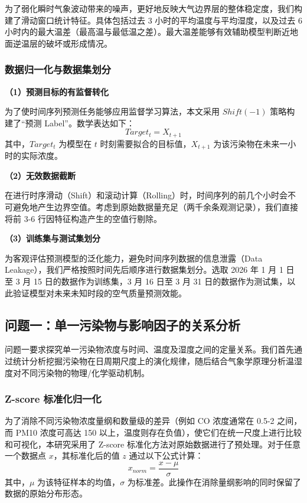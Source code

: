 \documentclass[a4paper, 12pt]{ctexart} %
\begin{document}
为了弱化瞬时气象波动带来的噪声，更好地反映大气边界层的整体稳定度，我们构建了滑动窗口统计特征。具体包括过去 3 小时的平均温度与平均湿度，以及过去 6 小时内的最大温差（最高温与最低温之差）。最大温差能够有效辅助模型判断近地面逆温层的破坏或形成情况。

\subsubsection{数据归一化与数据集划分}

\textbf{（1）预测目标的有监督转化}

为了使时间序列预测任务能够应用监督学习算法，本文采用 $Shift(-1)$ 策略构建了“预测 Label”。数学表达如下：
$$ Target_{t} = X_{t+1} $$
其中，$Target_{t}$ 为模型在 $t$ 时刻需要拟合的目标值，$X_{t+1}$ 为该污染物在未来一小时的实际浓度。

\textbf{（2）无效数据截断}

在进行时序滑动（Shift）和滚动计算（Rolling）时，时间序列的前几个小时会不可避免地产生边界空值。考虑到原始数据量充足（两千余条观测记录），我们直接将前 3-6 行因特征构造产生的空值行剔除。


\textbf{（3）训练集与测试集划分}

为客观评估预测模型的泛化能力，避免时间序列数据的信息泄露（Data Leakage），我们严格按照时间先后顺序进行数据集划分。选取 2026 年 1 月 1 日至 3 月 15 日的数据作为训练集，3 月 16 日至 3 月 31 日的数据作为测试集，以此验证模型对未来未知时段的空气质量预测效能。


\subsection{问题一：单一污染物与影响因子的关系分析}

问题一要求探究单一污染物浓度与时间、温度及湿度之间的定量关系。我们首先通过统计分析挖掘污染物在日周期尺度上的演化规律，随后结合气象学原理分析温湿度对不同污染物的物理/化学驱动机制。

\subsubsection{Z-score 标准化归一化}
为了消除不同污染物浓度量纲和数量级的差异（例如 CO 浓度通常在 0.5-2 之间，而 PM10 浓度可高达 150 以上，温度则存在负值），使它们在统一尺度上进行比较和可视化，本研究采用了 Z-score 标准化方法对原始数据进行了预处理。对于任意一个数据点 $x$，其标准化后的值 $z$ 通过以下公式计算：
\begin{equation}
    x_{norm} = \frac{x - \mu}{\sigma}
\end{equation}
其中，$\mu$ 为该特征样本的均值，$\sigma$ 为标准差。此操作在消除量纲影响的同时保留了数据的原始分布形态。
\end{document}
